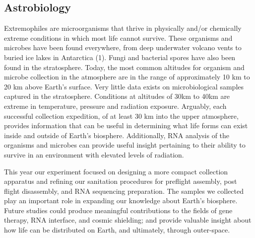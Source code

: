 \subsection{Astrobiology}
\label{sec:Astrobiology-Background}
Extremophiles are microorganisms that thrive in physically and/or chemically extreme conditions in which most life cannot survive. These organisms and microbes have been found everywhere, from deep underwater volcano vents to buried ice lakes in Antarctica (1). 
Fungi and bacterial spores have also been found in the stratosphere. Today, the most common altitudes for organism and microbe collection in the atmosphere are in the range of approximately 10 km to 20 km above Earth’s surface. Very little data exists on microbiological samples captured in the stratosphere. 
Conditions at altitudes of 30km to 40km are extreme in temperature, pressure and radiation exposure. Arguably, each successful collection expedition, of at least 30 km into the upper atmosphere, provides information that can be useful in determining what life forms can exist inside and outside of Earth’s biosphere. Additionally, RNA analysis of the organisms and microbes can provide useful insight pertaining to their ability to survive in an environment with elevated levels of radiation.  

This year our experiment focused on designing a more compact collection apparatus and refining our sanitation procedures for preflight assembly, post flight disassembly, and RNA sequencing preparation. The samples we collected play an important role in expanding our knowledge about Earth’s biosphere. Future studies could produce meaningful contributions to the fields of gene therapy, RNA interface, and cosmic shielding; and provide valuable insight about how life can be distributed on Earth, and ultimately, through outer-space.

